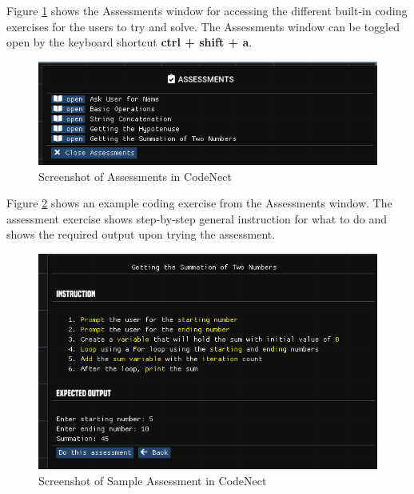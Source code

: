 \parx
Figure \ref{fig:cn_assessment} shows the Assessments window for accessing the
different built-in coding exercises for the users to try and solve. The
Assessments window can be toggled open by the keyboard shortcut \textbf{ctrl
+ shift + a}.

\begin{figure}[H]
	\centering
	\captionsetup{justification=centering}
	\captionsetup[figure]{list=yes}
	\includegraphics[width=\linewidth]{media/sc_assessments.png}
	\caption[Screenshot of Assessments in CodeNect]{Screenshot of Assessments in CodeNect}
	\label{fig:cn_assessment}
\end{figure}

\parx
Figure \ref{fig:cn_assessment_sample} shows an example coding exercise from the Assessments
window. The assessment exercise shows step-by-step general instruction for what to do
and shows the required output upon trying the assessment.

\begin{figure}[H]
	\centering
	\captionsetup{justification=centering}
	\captionsetup[figure]{list=yes}
	\includegraphics[width=\linewidth]{media/sc_assessments_sample.png}
	\caption[Screenshot of Sample Assessment in CodeNect]{Screenshot of Sample Assessment in CodeNect}
	\label{fig:cn_assessment_sample}
\end{figure}

